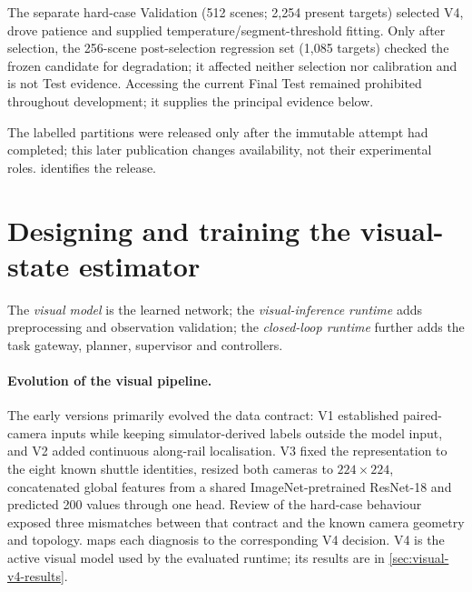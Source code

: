 The separate hard-case Validation (512 scenes; 2,254 present targets) selected
V4, drove patience and supplied temperature/segment-threshold fitting. Only
after selection, the 256-scene post-selection regression set (1,085 targets)
checked the frozen candidate for degradation; it affected neither selection nor
calibration and is not Test evidence. Accessing the current Final Test remained prohibited
throughout development; it supplies the principal evidence below.

The labelled partitions were released only after the immutable attempt had
completed; this later publication changes availability, not their experimental
roles.  identifies the release.

\section{Designing and training the visual-state estimator}

The \emph{visual model} is the learned network; the \emph{visual-inference
runtime} adds preprocessing and observation validation; the \emph{closed-loop
runtime} further adds the task gateway, planner, supervisor and controllers.

\paragraph{Evolution of the visual pipeline.}
The early versions primarily evolved the data contract: V1 established
paired-camera inputs while keeping simulator-derived labels outside the model
input, and V2 added continuous along-rail localisation. V3 fixed the
representation to the eight known shuttle identities, resized both cameras to
$224\times224$, concatenated global features from a shared ImageNet-pretrained
ResNet-18 and predicted 200 values through one head. Review of the hard-case
behaviour exposed three mismatches between that contract and the known camera
geometry and topology.  maps each diagnosis to
the corresponding V4 decision. V4 is the active visual model used by the
evaluated runtime; its results are in \cref{sec:visual-v4-results}.

